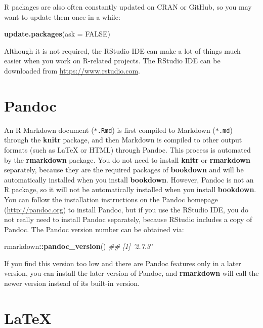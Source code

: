 \documentclass[
  12pt,
]{krantz}
\makeatletter
\newenvironment{Shaded}{\begin{snugshade}}{\end{snugshade}}
\newcommand{\CommentTok}[1]{\textcolor[rgb]{0.56,0.35,0.01}{\textit{#1}}}
\newcommand{\DataTypeTok}[1]{\textcolor[rgb]{0.13,0.29,0.53}{#1}}
\newcommand{\KeywordTok}[1]{\textcolor[rgb]{0.13,0.29,0.53}{\textbf{#1}}}
\newcommand{\NormalTok}[1]{#1}
\newcommand{\OperatorTok}[1]{\textcolor[rgb]{0.81,0.36,0.00}{\textbf{#1}}}
\newcommand{\OtherTok}[1]{\textcolor[rgb]{0.56,0.35,0.01}{#1}}
\newenvironment{kframe}{%
\medskip{}
\setlength{\fboxsep}{.8em}
 \def\at@end@of@kframe{}%
 \ifinner\ifhmode%
  \def\at@end@of@kframe{\end{minipage}}%
  \begin{minipage}{\columnwidth}%
 \fi\fi%
 \def\FrameCommand##1{\hskip\@totalleftmargin \hskip-\fboxsep
 \colorbox{shadecolor}{##1}\hskip-\fboxsep
     \hskip-\linewidth \hskip-\@totalleftmargin \hskip\columnwidth}%
 \MakeFramed {\advance\hsize-\width
   \@totalleftmargin\z@ \linewidth\hsize
   \@setminipage}}%
 {\par\unskip\endMakeFramed%
 \at@end@of@kframe}
\renewenvironment{Shaded}{\begin{kframe}}{\end{kframe}}
\makeatother
\begin{document}
R packages are also often constantly updated on CRAN or GitHub, so you may want to update them once in a while:

\begin{Shaded}
\begin{Highlighting}[]
\KeywordTok{update.packages}\NormalTok{(}\DataTypeTok{ask =} \OtherTok{FALSE}\NormalTok{)}
\end{Highlighting}
\end{Shaded}

Although it is not required, the RStudio IDE can make a lot of things much easier when you work on R-related projects. The RStudio IDE can be downloaded from \url{https://www.rstudio.com}.

\hypertarget{pandoc}{%
\section{Pandoc}\label{pandoc}}

An R Markdown document (\texttt{*.Rmd}) is first compiled to Markdown (\texttt{*.md}) through the \textbf{knitr} package, and then Markdown is compiled to other output formats (such as LaTeX or HTML) through Pandoc. This process is automated by the \textbf{rmarkdown} package. You do not need to install \textbf{knitr} or \textbf{rmarkdown} separately, because they are the required packages of \textbf{bookdown} and will be automatically installed when you install \textbf{bookdown}. However, Pandoc is not an R package, so it will not be automatically installed when you install \textbf{bookdown}. You can follow the installation instructions on the Pandoc homepage (\url{http://pandoc.org}) to install Pandoc, but if you use the RStudio IDE, you do not really need to install Pandoc separately, because RStudio includes a copy of Pandoc. The Pandoc version number can be obtained via:

\begin{Shaded}
\begin{Highlighting}[]
\NormalTok{rmarkdown}\OperatorTok{::}\KeywordTok{pandoc_version}\NormalTok{()}
\CommentTok{## [1] '2.7.3'}
\end{Highlighting}
\end{Shaded}

If you find this version too low and there are Pandoc features only in a later version, you can install the later version of Pandoc, and \textbf{rmarkdown} will call the newer version instead of its built-in version.

\hypertarget{latex}{%
\section{LaTeX}\label{latex}}
\end{document}
